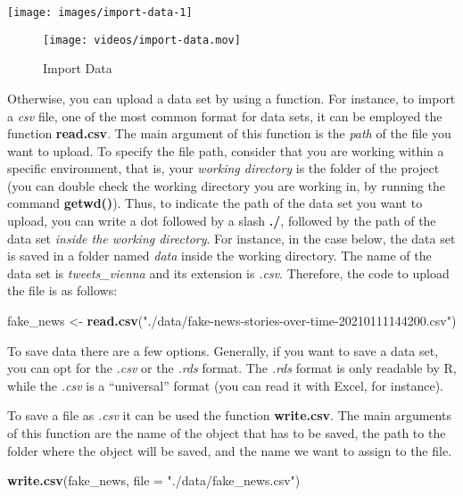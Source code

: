 \documentclass[
]{article}
\newenvironment{Shaded}{\begin{snugshade}}{\end{snugshade}}
\newcommand{\AttributeTok}[1]{\textcolor[rgb]{0.13,0.29,0.53}{#1}}
\newcommand{\FunctionTok}[1]{\textcolor[rgb]{0.13,0.29,0.53}{\textbf{#1}}}
\newcommand{\NormalTok}[1]{#1}
\newcommand{\OtherTok}[1]{\textcolor[rgb]{0.56,0.35,0.01}{#1}}
\newcommand{\StringTok}[1]{\textcolor[rgb]{0.31,0.60,0.02}{#1}}
\begin{document}
\texttt{[image: images/import-data-1]}

\begin{figure}
\centering
\texttt{[image: videos/import-data.mov]}
\caption{Import Data}
\end{figure}

Otherwise, you can upload a data set by using a function. For instance, to import a \emph{csv} file, one of the most common format for data sets, it can be employed the function \textbf{read.csv}. The main argument of this function is the \emph{path} of the file you want to upload.
To specify the file path, consider that you are working within a specific environment, that is, your \emph{working directory} is the folder of the project (you can double check the working directory you are working in, by running the command \textbf{getwd()}). Thus, to indicate the path of the data set you want to upload, you can write a dot followed by a slash \textbf{./}, followed by the path of the data set \emph{inside the working directory}. For instance, in the case below, the data set is saved in a folder named \emph{data} inside the working directory. The name of the data set is \emph{tweets\_vienna} and its extension is \emph{.csv}. Therefore, the code to upload the file is as follows:

\begin{Shaded}
\begin{Highlighting}[]
\NormalTok{fake\_news }\OtherTok{\textless{}{-}} \FunctionTok{read.csv}\NormalTok{(}\StringTok{"./data/fake{-}news{-}stories{-}over{-}time{-}20210111144200.csv"}\NormalTok{)}
\end{Highlighting}
\end{Shaded}

To save data there are a few options. Generally, if you want to save a data set, you can opt for the \emph{.csv} or the \emph{.rds} format. The \emph{.rds} format is only readable by R, while the \emph{.csv} is a ``universal'' format (you can read it with Excel, for instance).

To save a file as \emph{.csv} it can be used the function \textbf{write.csv}. The main arguments of this function are the name of the object that has to be saved, the path to the folder where the object will be saved, and the name we want to assign to the file.

\begin{Shaded}
\begin{Highlighting}[]
\FunctionTok{write.csv}\NormalTok{(fake\_news, }\AttributeTok{file =} \StringTok{"./data/fake\_news.csv"}\NormalTok{)}
\end{Highlighting}
\end{Shaded}
\end{document}
